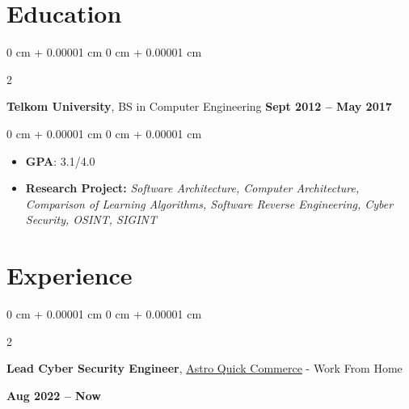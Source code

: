 \documentclass[10pt, letterpaper]{article}
\newenvironment{highlights}{
    \begin{itemize}[
        topsep=0.10 cm,
        parsep=0.10 cm,
        partopsep=0pt,
        itemsep=0pt,
        leftmargin=0 cm + 10pt
    ]
}{
    \end{itemize}
} %
\newenvironment{onecolentry}{
    \begin{adjustwidth}{
        0 cm + 0.00001 cm
    }{
        0 cm + 0.00001 cm
    }
}{
    \end{adjustwidth}
} %
\newenvironment{twocolentry}[2][]{
    \onecolentry
    \def\secondColumn{#2}
    \setcolumnwidth{\fill, 4.5 cm}
    \begin{paracol}{2}
}{
    \switchcolumn \raggedleft \secondColumn
    \end{paracol}
    \endonecolentry
} %
\let\hrefWithoutArrow\href
\begin{document}
    \section{Education}
   \vspace{0.35 cm}
        \begin{twocolentry}{
            \textbf{Sept 2012 – May 2017}
        }
            \textbf{Telkom University}, BS in Computer Engineering\end{twocolentry}

        \vspace{0.10 cm}
        \begin{onecolentry}
            \begin{highlights}
                \item \textbf{GPA}: 3.1/4.0
                \item \textbf{Research Project:} \textit{Software Architecture, Computer Architecture, Comparison of Learning Algorithms, Software Reverse Engineering, Cyber Security, OSINT, SIGINT}
            \end{highlights}
        \end{onecolentry}



    
    \section{Experience}
          \vspace{0.35 cm}
        \begin{twocolentry}{\textbf{Aug 2022 – Now}}
            \textbf{Lead Cyber Security Engineer}, \hrefWithoutArrow{https://astronauts.id}{Astro Quick Commerce} - Work From Home
        \end{twocolentry}
\end{document}
